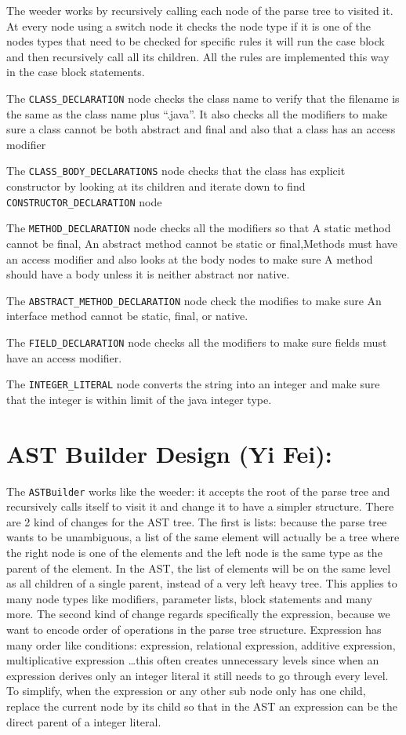 \documentclass[12pt]{article}
\begin{document}
The weeder works by recursively calling each node of the parse tree to visited it. At every node
using a switch node it checks the node type if it is one of the nodes types that need to be checked
for specific rules it will run the case block and then recursively call all its children. All the
rules are implemented this way in the case block statements.

The \texttt{CLASS\_DECLARATION} node checks  the class name to verify that the filename is the same
as the class name plus ``.java''.  It also checks all the modifiers to make sure a class cannot be
both abstract and final and also that a class has an access modifier

The \texttt{CLASS\_BODY\_DECLARATIONS} node checks that the class has explicit constructor by
looking at its children and iterate down to find \texttt{CONSTRUCTOR\_DECLARATION} node

The \texttt{METHOD\_DECLARATION} node checks all the modifiers so that A static method cannot be
final, An abstract method cannot be static or final,Methods must have an access modifier and also
looks at the body nodes to make sure A method should have a body unless it is neither abstract nor
native.

The \texttt{ABSTRACT\_METHOD\_DECLARATION} node check the modifies to make sure An interface method
cannot be static, final, or native.

The \texttt{FIELD\_DECLARATION} node checks all the modifiers to make sure fields must have an
access modifier.

The \texttt{INTEGER\_LITERAL} node converts the string into an integer and make sure that the
integer is within limit of the java integer type.


\section*{AST Builder Design (Yi Fei):}

The \texttt{ASTBuilder} works like the weeder: it accepts the root of the parse tree and recursively
calls itself to visit it and change it to have a simpler structure. There are 2 kind of changes for
the AST tree. The first is lists: because the parse tree wants to be unambiguous, a list of the same
element will actually be a tree where the right node is one of the elements and the left node is the
same type as the parent of the element. In the AST, the list of elements will be on the same level
as all children of a single parent, instead of a very left heavy tree. This applies to many node
types like modifiers, parameter lists, block statements and many more. The second kind of change
regards specifically the expression, because we want to encode order of operations in the parse tree
structure. Expression has many order like conditions: expression, relational expression, additive
expression, multiplicative expression \ldots this often creates unnecessary levels since when an
expression derives only an integer literal it still needs to go through every level. To simplify,
when the expression or any other sub node only has one child, replace the current node by its child
so that in the AST an expression can be the direct parent of a integer literal.
\end{document}
